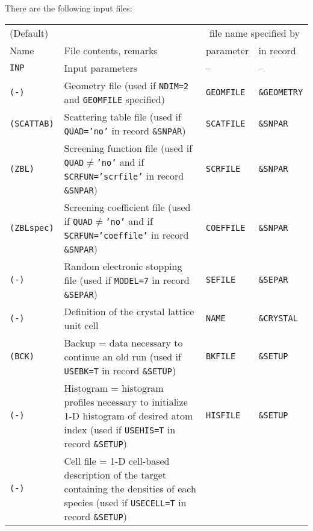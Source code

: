 There are the following input files:
\bigskip
%
\begin{center}
\begin{tabular}{|l|p{}|l|l|}
\hline
(Default) &                   & \multicolumn{2}{c|}{file name specified by} \\
Name      & File contents, remarks     & parameter  & in record \\
\hline
\tt INP         & Input parameters                         & --           & -- \\
\tt (-)         & \raggedright Geometry file (used if \texttt{NDIM=2} and
\texttt{GEOMFILE} specified) & \texttt{GEOMFILE} & \tt \&GEOMETRY \\ 
\tt (SCATTAB)   & \raggedright Scattering table file (used if \texttt{QUAD='no'} in record 
                  \texttt{\&SNPAR})                        & \tt SCATFILE & \tt \&SNPAR \\
\tt (ZBL)       & \raggedright Screening function file (used if 
                  \texttt{QUAD$\ne$'no'} and if \texttt{SCRFUN='scrfile'} in record 
                  \texttt{\&SNPAR})                        & \tt SCRFILE  & \tt \&SNPAR \\
\tt (ZBLspec)   & \raggedright Screening coefficient file (used if \texttt{QUAD$\ne$'no'} and 
                  if \texttt{SCRFUN='coeffile'} in record \texttt{\&SNPAR})
                                                           & \tt COEFFILE & \tt \&SNPAR \\
\tt (-)         & Random electronic stopping file (used if \texttt{MODEL=7} in
                  record \texttt{\&SEPAR})                 & \tt SEFILE   & \tt \&SEPAR \\
\tt (-)         & Definition of the crystal lattice unit cell  
                                                           & \tt NAME     & \tt \&CRYSTAL \\
\tt (BCK)       & Backup = data necessary to continue an old run (used if \texttt{USEBK=T} in 
                  record \texttt{\&SETUP})                 & \tt BKFILE   & \tt \&SETUP \\
\tt (-)         & Histogram = histogram profiles necessary to initialize 1-D
                  histogram of desired atom index (used if \texttt{USEHIS=T} in
                  record \texttt{\&SETUP})                 & \tt HISFILE  & \tt \&SETUP \\
\tt (-)         & Cell file = 1-D cell-based description of the target
                  containing the densities of each species (used if
                  \texttt{USECELL=T} in record \texttt{\&SETUP}) 

\end{tabular}
\end{center}
